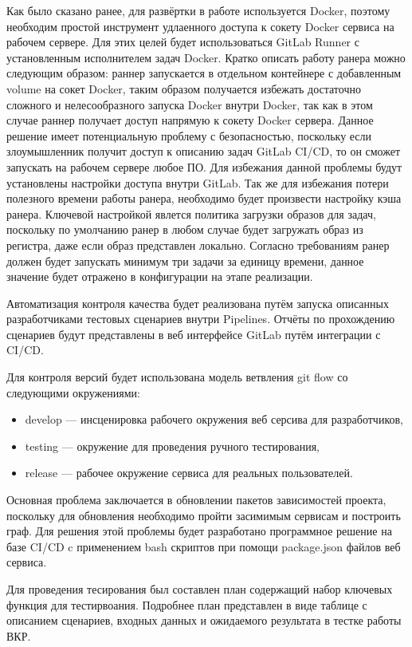 Как было сказано ранее, для развёртки в работе используется Docker, поэтому необходим простой инструмент удлаенного доступа к сокету Docker сервиса на рабочем сервере.
Для этих целей будет использоваться GitLab Runner с установленным исполнителем задач Docker.
Кратко описать работу ранера можно следующим образом: раннер запускается в отдельном контейнере с добавленным volume на сокет Docker,
таким образом получается избежать достаточно сложного и нелесообразного запуска Docker внутри Docker,
так как в этом случае раннер получает доступ напрямую к сокету Docker сервера.
Данное решение имеет потенциальную проблему с безопасностью, поскольку если злоумышленник получит доступ к описанию задач GitLab CI/CD, то он сможет запускать на рабочем сервере любое ПО.
Для избежания данной проблемы будут установлены настройки доступа внутри GitLab.
Так же для избежания потери полезного времени работы ранера, необходимо будет произвести настройку кэша ранера.
Ключевой настройкой явлется политика загрузки образов для задач, поскольку по умолчанию ранер в любом случае будет загружать образ из регистра, даже если образ представлен локально.
Согласно требованиям ранер должен будет запускать минимум три задачи за единицу времени, данное значение будет отражено в конфигурации на этапе реализации.

Автоматизация контроля качества будет реализована путём запуска описанных разработчиками тестовых сценариев внутри Pipelines.
Отчёты по прохождению сценариев будут представлены в веб интерфейсе GitLab путём интеграции с CI/CD.

Для контроля версий будет использована модель ветвления git flow со следующими окружениями:

\begin{itemize}
    \item develop --- инсценировка рабочего окружения веб серсива для разработчиков,
    \item testing --- окружение для проведения ручного тестирования,
    \item release --- рабочее окружение сервиса для реальных пользователей.
\end{itemize}

Основная проблема заключается в обновлении пакетов зависимостей проекта, поскольку для обновления необходимо пройти засимимым сервисам и построить граф.
Для решения этой проблемы будет разработано программное решение на базе CI/CD c применением bash скриптов при помощи package.json файлов веб сервиса.

Для проведения тесирования был составлен план содержащий набор ключевых функция для тестирвоания.
Подробнее план представлен в виде таблице с описанием сценариев, входных данных и ожидаемого результата в тестке работы ВКР.



